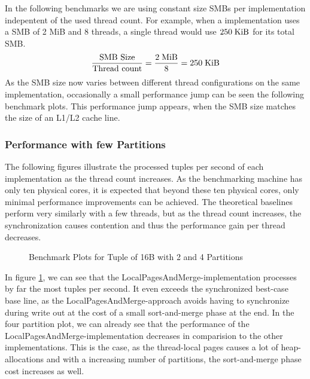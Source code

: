In the following benchmarks we are using constant size \acp{SMB} per implementation indepentent of the used thread count.
For example, when a implementation uses a \ac{SMB} of 2 MiB and 8 threads, a single thread would use $250 \textrm{\;KiB}$ for its total \ac{SMB}.
\begin{equation}
  \frac{\textrm{SMB Size}} {\textrm{Thread count}} = \frac{2 \textrm{\;MiB}}{8} = 250 \textrm{\;KiB}
\end{equation}
As the \ac{SMB} size now varies between different thread configurations on the same implementation, occasionally a small performance jump can be seen the following benchmark plots.
This performance jump appears, when the \ac{SMB} size matches the size of an L1/L2 cache line.

\subsubsection{Performance with few Partitions}
The following figures illustrate the processed tuples per second of each implementation as the thread count increases.
As the benchmarking machine has only ten physical cores, it is expected that beyond these ten physical cores, only minimal performance improvements can be achieved.
The theoretical baselines perform very similarly with a few threads, but as the thread count increases, the synchronization causes contention and thus the performance gain per thread decreases.

\begin{figure}[h]
  \centering
  \begin{subfigure}{.49\textwidth}
    \centering
    \resizebox{\linewidth}{!}{}
  \end{subfigure}
  \begin{subfigure}{.49\textwidth}
    \centering
    \resizebox{\linewidth}{!}{}
  \end{subfigure}
  \begin{subfigure}{\textwidth}
    \centering
    \resizebox{\linewidth}{!}{}
  \end{subfigure}
  \caption[Shuffle Benchmark Plots for Tuple of 16B with 2 and 4 Partitions]{Benchmark Plots for Tuple of 16B with 2 and 4 Partitions}
  \label{plot-shuffle-16B-2-4}
\end{figure}
In figure \ref{plot-shuffle-16B-2-4}, we can see that the LocalPagesAndMerge-implementation processes by far the most tuples per second.
It even exceeds the synchronized best-case base line, as the LocalPagesAndMerge-approach avoids having to synchronize during write out at the cost of a small sort-and-merge phase at the end.
In the four partition plot, we can already see that the performance of the LocalPagesAndMerge-implementation decreases in comparision to the other implementations.
This is the case, as the thread-local pages causes a lot of heap-allocations and with a increasing number of partitions, the sort-and-merge phase cost increases as well.

